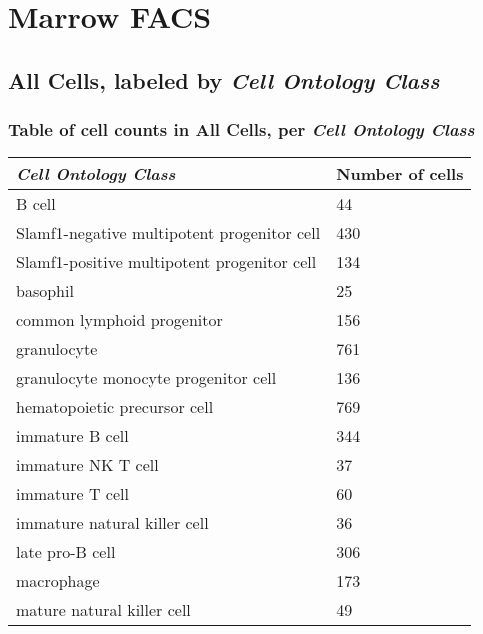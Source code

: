 \clearpage
\section{Marrow FACS}

\subsection{All Cells, labeled by \emph{Cell Ontology Class}}
\subsubsection{Table of cell counts in All Cells, per \emph{Cell Ontology Class}}\begin{table}[h]
\centering
\label{my-label}
\begin{tabular}{@{}ll@{}}
\toprule

\emph{Cell Ontology Class}& Number of cells \\ \midrule
B cell & 44 \\

Slamf1-negative multipotent progenitor cell & 430 \\

Slamf1-positive multipotent progenitor cell & 134 \\

basophil & 25 \\

common lymphoid progenitor & 156 \\

granulocyte & 761 \\

granulocyte monocyte progenitor cell & 136 \\

hematopoietic precursor cell & 769 \\

immature B cell & 344 \\

immature NK T cell & 37 \\

immature T cell & 60 \\

immature natural killer cell & 36 \\

late pro-B cell & 306 \\

macrophage & 173 \\

mature natural killer cell & 49 \\


\end{tabular}
\end{table}
